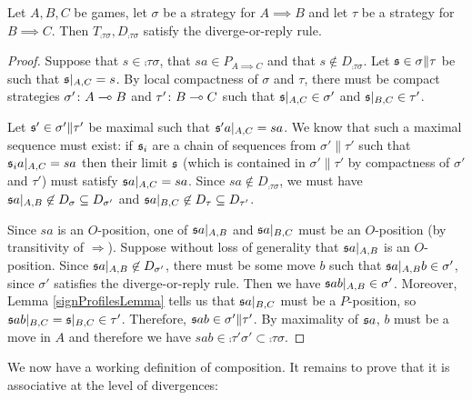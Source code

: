 \documentclass{article}
\begin{document}
\begin{proposition}
  Let $A,B,C$ be games, let $\sigma$ be a strategy for $A\implies B$ and let $\tau$ be a strategy for $B\implies C$.  Then $T_{\comp\tau\sigma}, D_{\comp\tau\sigma}$ satisfy the diverge-or-reply rule.

  \begin{proof}
    Suppose that $s\in\comp\tau\sigma$, that $sa\in P_{A\implies C}$ and that $s\not\in D_{\comp\tau\sigma}$.  Let $\mathfrak s\in\sigma\|\tau$ be such that $\mathfrak s\vert_{A,C}=s$.  By local compactness of $\sigma$ and $\tau$, there must be compact strategies $\sigma'\colon A\multimap B$ and $\tau'\colon B\multimap C$ such that $\mathfrak s\vert_{A,C}\in\sigma'$ and $\mathfrak s\vert_{B,C}\in\tau'$.  
    
    Let $\mathfrak s'\in\sigma'\|\tau'$ be maximal such that $\mathfrak s'a\vert_{A,C}=sa$.  We know that such a maximal sequence must exist: if $\mathfrak s_i$ are a chain of sequences from $\sigma'\|\tau'$ such that $\mathfrak s_ia\vert_{A,C}=sa$ then their limit $\mathfrak s$ (which is contained in $\sigma'\|\tau'$ by compactness of $\sigma'$ and $\tau'$) must satisfy $\mathfrak s a\vert_{A,C}=s a$.  Since $sa\not\in D_{\comp\tau\sigma}$, we must have $\mathfrak s a\vert_{A,B}\not\in D_\sigma\subseteq D_{\sigma'}$ and $\mathfrak s a\vert_{B,C}\not\in D_\tau\subseteq D_{\tau'}$.  
    
    Since $sa$ is an $O$-position, one of $\mathfrak s a\vert_{A,B}$ and $\mathfrak s a\vert_{B,C}$ must be an $O$-position (by transitivity of $\Rightarrow$).  Suppose without loss of generality that $\mathfrak s a\vert_{A,B}$ is an $O$-position.  Since $\mathfrak s a\vert_{A,B}\not\in D_{\sigma'}$, there must be some move $b$ such that $\mathfrak s a\vert_{A,B}b\in\sigma'$, since $\sigma'$ satisfies the diverge-or-reply rule.  Then we have $\mathfrak s ab\vert_{A,B}\in\sigma'$.  Moreover, Lemma \ref{signProfilesLemma} tells us that $\mathfrak s a\vert_{B,C}$ must be a $P$-position, so $\mathfrak s ab\vert_{B,C}=\mathfrak s\vert_{B,C}\in\tau'$.  Therefore, $\mathfrak s ab\in\sigma'\|\tau'$.  By maximality of $\mathfrak s a$, $b$ must be a move in $A$ and therefore we have $sab\in\comp{\tau'}{\sigma'}\subset\comp\tau\sigma$.
  \end{proof}
\end{proposition}

We now have a working definition of composition.  It remains to prove that it is associative at the level of divergences:
\end{document}
